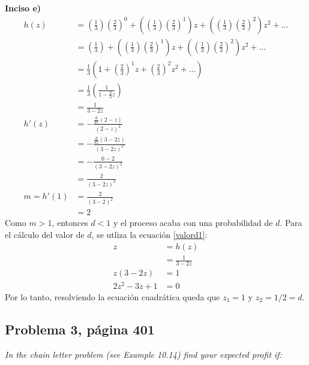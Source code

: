 \documentclass{article}
\begin{document}
\noindent \textbf{Inciso e)}
\begin{align}
    \nonumber
        h(z)        & = \left(\frac{1}{3}\right)\left(\frac{2}{3}\right)^0 + \left(\left(\frac{1}{3}\right)\left(\frac{2}{3}\right)^1\right)z + \left(\left(\frac{1}{3}\right)\left(\frac{2}{3}\right)^2\right)z^2 + \dots \\ \nonumber
                    & = \left(\frac{1}{3}\right) + \left(\left(\frac{1}{3}\right)\left(\frac{2}{3}\right)^1\right)z + \left(\left(\frac{1}{3}\right)\left(\frac{2}{3}\right)^2\right)z^2 + \dots \\ \nonumber
                    & = \frac{1}{3} \left(1 + \left(\frac{2}{3}\right)^1z + \left(\frac{2}{3}\right)^2z^2 + \dots \right)\\ \nonumber
                    & = \frac{1}{3} \left(\frac{1}{1-\frac{2}{3}z} \right)\\ \nonumber
                    & = \frac{1}{3-2z} \\ \nonumber
        h'(z)       & = -\frac{\frac{d}{dz}(2-z)}{(2-z)^2} \\ \nonumber
                     & = -\frac{\frac{d}{dz}(3-2z)}{(3-2z)^2} \\ \nonumber
                    & =-\frac{0-2}{(3-2z)^2} \\ \nonumber
                    & =\frac{2}{(3-2z)^2} \\ \nonumber
        m = h'(1)   & = \frac{2}{(3-2)^2}  \\ \nonumber
                    & = 2 \nonumber
\end{align}
Como $m > 1$, entonces $d<1$ y el proceso acaba con una probabilidad de $d$. Para el cálculo del valor de $d$, se utliza la ecuación \ref{valord1}:
\begin{align} \label{valord1}
        z & = h{(z)}\\ \nonumber
          & = \frac{1}{3-2z} \\ \nonumber
        z({3-2z}) & = 1\\ 
        2z^2-3z+1 & = 0  \nonumber 
\end{align}
Por lo tanto, resolviendo la ecuación cuadrática queda que $z_1 = 1$ y $z_2 = 1/2 = d$.

\subsection{Problema 3, página 401}
\noindent \textit{In the chain letter problem (see Example 10.14) find your expected profit if:}
\end{document}

